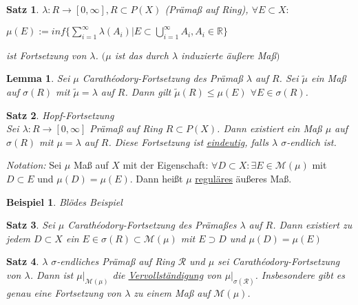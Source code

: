 \documentclass[11pt]{memoir}
\theoremstyle{changebreak}
\newtheorem{Beispiel}{Beispiel}[chapter]
\newtheorem{Lemma}{Lemma}[chapter]
\newtheorem{Satz}{Satz}[chapter]
\newcommand{\cara}{Carathéodory-Fortsetzung}
\begin{document}
\begin{Satz}
$\lambda: R \rightarrow [0, \infty], {}R \subset P(X)$ (Prämaß auf Ring), $\forall {}E \subset X:$ \\
\begin{center}
$\mu(E):= inf\{ \sum\limits_{i=1}^{\infty} \lambda(A_i) | E \subset \bigcup\limits_{i=1}^{\infty} A_i, A_i \in \mathbb{R}\}$
\end{center}
ist Fortsetzung von $\lambda$. $(\mu$ ist das durch $\lambda$ induzierte äußere Maß$)$
\end{Satz}

\begin{Lemma}
Sei $\mu$ \cara{} des Prämaß $\lambda$ auf $R$. Sei $\tilde{\mu}$ ein Maß auf $\sigma(R)$ mit $\tilde{\mu} = \lambda$ auf $R$. Dann gilt $\tilde{\mu}(R) \leq \mu(E)$ $\forall E \in \sigma(R)$.
\end{Lemma}

\begin{Satz} \emph{Hopf-Fortsetzung} \\
Sei $\lambda: R \rightarrow [0, \infty]$ Prämaß auf Ring $R \subset P(X)$. Dann existiert ein Maß $\mu$ auf $\sigma(R)$ mit $\mu =\lambda$ auf $R$. Diese Fortsetzung ist \underline{eindeutig}, falls $\lambda$ $\sigma$-endlich ist.
\end{Satz}

\emph{Notation:}
Sei $\mu$ Maß auf $X$ mit der Eigenschaft: $\forall D \subset X: \exists E \in \mathscr{M}(\mu)$ mit $D \subset E$ und $\mu(D) = \mu(E)$. Dann heißt $\mu$ \underline{reguläres} äußeres Maß.

\begin{Beispiel}
Blödes Beispiel
\end{Beispiel}

\begin{Satz}
Sei $\mu$ \cara{} des Prämaßes $\lambda$ auf $R$. Dann existiert zu jedem $D \subset X$ ein $E \in \sigma(R) \subset \mathscr M(\mu)$ mit $E \supset D$ und $\mu(D) = \mu(E)$
\end{Satz}

\begin{Satz}
$\lambda$  $\sigma$-endliches Prämaß auf Ring $\mathscr R$ und $\mu$ sei \cara{} von $\lambda$. Dann ist $\mu|_{\mathscr M(\mu)}$ die \underline{Vervollständigung} von $\mu|_{\sigma(\mathscr R)}$. Insbesondere gibt es genau eine Fortsetzung von $\lambda$ zu einem Maß auf $\mathscr M(\mu)$.
\end{Satz}
\end{document}
